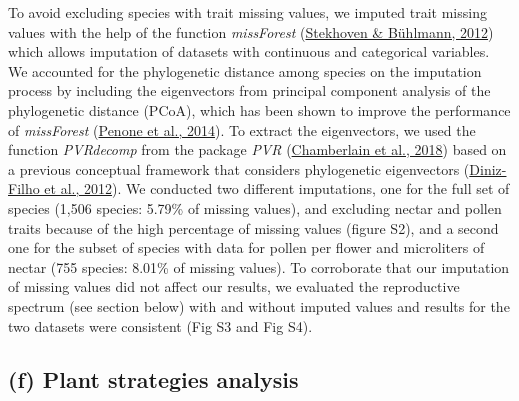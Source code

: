 \documentclass[
  12pt,
  a4paper,
]{article}
\begin{document}
To avoid excluding species with trait missing values, we imputed trait missing values with the help of the function \emph{missForest} (\protect\hyperlink{ref-stekhoven2012}{Stekhoven \& Bühlmann, 2012}) which allows imputation of datasets with continuous and categorical variables. We accounted for the phylogenetic distance among species on the imputation process by including the eigenvectors from principal component analysis of the phylogenetic distance (PCoA), which has been shown to improve the performance of \emph{missForest} (\protect\hyperlink{ref-penone2014}{Penone et al., 2014}). To extract the eigenvectors, we used the function \emph{PVRdecomp} from the package \emph{PVR} (\protect\hyperlink{ref-santos2018}{Chamberlain et al., 2018}) based on a previous conceptual framework that considers phylogenetic eigenvectors (\protect\hyperlink{ref-diniz-filho2012}{Diniz-Filho et al., 2012}). We conducted two different imputations, one for the full set of species (1,506 species: 5.79\% of missing values), and excluding nectar and pollen traits because of the high percentage of missing values (figure S2), and a second one for the subset of species with data for pollen per flower and microliters of nectar (755 species: 8.01\% of missing values). To corroborate that our imputation of missing values did not affect our results, we evaluated the reproductive spectrum (see section below) with and without imputed values and results for the two datasets were consistent (Fig S3 and Fig S4).

\hypertarget{f-plant-strategies-analysis}{%
\subsection{(f) Plant strategies analysis}\label{f-plant-strategies-analysis}}
\end{document}
